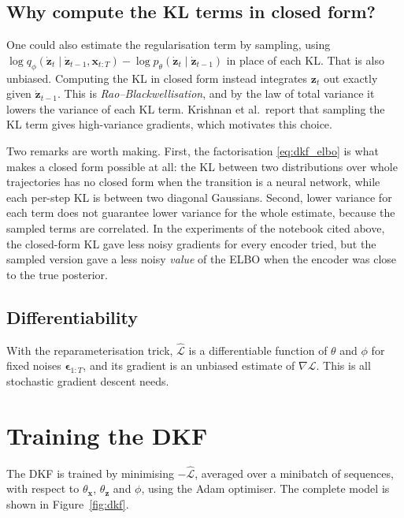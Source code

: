 \subsection{Why compute the KL terms in closed form?}

One could also estimate the regularisation term by sampling, using
$\log q_\phi(\dot{\mathbf{z}}_t \mid \dot{\mathbf{z}}_{t-1},
\mathbf{x}_{t:T}) - \log p_\theta(\dot{\mathbf{z}}_t \mid
\dot{\mathbf{z}}_{t-1})$ in place of each KL. That is also unbiased.
Computing the KL in closed form instead integrates $\mathbf{z}_t$ out
exactly given $\dot{\mathbf{z}}_{t-1}$. This is
\emph{Rao--Blackwellisation}, and by the law of total variance it lowers
the variance of each KL term. Krishnan et al.\ report that sampling the
KL term gives high-variance gradients, which motivates this choice.

Two remarks are worth making. First, the factorisation
\eqref{eq:dkf_elbo} is what makes a closed form possible at all: the KL
between two distributions over whole trajectories has no closed form
when the transition is a neural network, while each per-step KL is
between two diagonal Gaussians. Second, lower variance for each term
does not guarantee lower variance for the whole estimate, because the
sampled terms are correlated. In the experiments of the notebook cited
above, the closed-form KL gave less noisy gradients for every encoder
tried, but the sampled version gave a less noisy \emph{value} of the
ELBO when the encoder was close to the true posterior.

\subsection{Differentiability}

With the reparameterisation trick, $\hat{\mathcal{L}}$ is a
differentiable function of $\theta$ and $\phi$ for fixed noises
$\boldsymbol{\epsilon}_{1:T}$, and its gradient is an unbiased estimate
of $\nabla\mathcal{L}$. This is all stochastic gradient descent needs.

\section{Training the DKF}\label{sec:training}

The DKF is trained by minimising $-\hat{\mathcal{L}}$, averaged over a
minibatch of sequences, with respect to $\theta_{\mathbf{x}}$,
$\theta_{\mathbf{z}}$ and $\phi$, using the Adam optimiser. The complete
model is shown in Figure~\ref{fig:dkf}.


